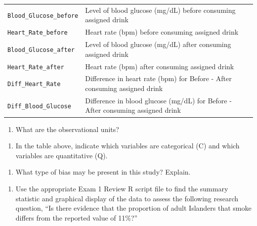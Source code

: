 \documentclass[
]{report}
\providecommand{\tightlist}{%
  \setlength{\itemsep}{0pt}\setlength{\parskip}{0pt}}
\begin{document}
\begin{longtable}[]{@{}
  >{\raggedright\arraybackslash}p{}
  >{\raggedright\arraybackslash}p{}@{}}
\texttt{Blood\_Glucose\_before} & Level of blood glucose (mg/dL) before consuming assigned drink \\
\texttt{Heart\_Rate\_before} & Heart rate (bpm) before consuming assigned drink \\
\texttt{Blood\_Glucose\_after} & Level of blood glucose (mg/dL) after consuming assigned drink \\
\texttt{Heart\_Rate\_after} & Heart rate (bpm) after consuming assigned drink \\
\texttt{Diff\_Heart\_Rate} & Difference in heart rate (bpm) for Before - After consuming assigned drink \\
\texttt{Diff\_Blood\_Glucose} & Difference in blood glucose (mg/dL) for Before - After consuming assigned drink \\
\end{longtable}

\begin{enumerate}
\def\labelenumi{\arabic{enumi}.}
\tightlist
\item
  What are the observational units?
\end{enumerate}

\vspace{0.2in}

\begin{enumerate}
\def\labelenumi{\arabic{enumi}.}
\setcounter{enumi}{1}
\tightlist
\item
  In the table above, indicate which variables are categorical (C) and which variables are quantitative (Q).
\end{enumerate}

\vspace{0.1in}

\begin{enumerate}
\def\labelenumi{\arabic{enumi}.}
\setcounter{enumi}{2}
\tightlist
\item
  What type of bias may be present in this study? Explain.
\end{enumerate}

\vspace{0.6in}

\newpage

\begin{enumerate}
\def\labelenumi{\arabic{enumi}.}
\setcounter{enumi}{3}
\tightlist
\item
  Use the appropriate Exam 1 Review R script file to find the summary statistic and graphical display of the data to assess the following research question, ``Is there evidence that the proportion of adult Islanders that smoke differs from the reported value of 11\%?''
\end{enumerate}
\end{document}
